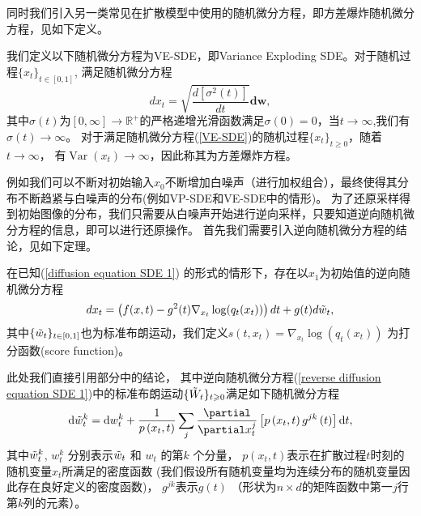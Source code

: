 同时我们引入另一类常见在扩散模型中使用的随机微分方程，即方差爆炸随机微分方程，见如下定义。
\begin{definition}我们定义以下随机微分方程为VE-SDE，即Variance Exploding SDE。对于随机过程$\{x_t\}_{t\in [0,1]}$, 满足随机微分方程
    \begin{equation}
        dx_t = \sqrt{\frac{d\left[\sigma^2(t)\right]}{dt}}\mathbf{d}\mathbf{w}, \label{VE-SDE}
    \end{equation}
    其中$\sigma(t)$为$[0,\infty]\xrightarrow{}\mathbb{R}^+$的严格递增光滑函数满足$\sigma(0)=0$，当$t\to \infty$,我们有 $\sigma(t)\xrightarrow{}\infty$。
    对于满足随机微分方程(\ref{VE-SDE})的随机过程$\{x_t\}_{t\geq 0}$，随着$t\to \infty$， 有$\operatorname{Var}(x_t)\xrightarrow{}\infty$，因此称其为方差爆炸方程。 
\end{definition}

例如我们可以不断对初始输入$x_0$不断增加白噪声（进行加权组合），最终使得其分布不断趋紧与白噪声的分布(例如VP-SDE和VE-SDE中的情形)。 为了还原采样得到初始图像的分布，我们只需要从白噪声开始进行逆向采样，只要知道逆向随机微分方程的信息，即可以进行还原操作。 首先我们需要引入逆向随机微分方程的结论，见如下定理。

\begin{theorem}[逆向随机微分方程]
在已知(\ref{diffusion equation SDE 1}) 的形式的情形下，存在以$x_1$为初始值的逆向随机微分方程
\begin{equation}
     dx_t= \left(f(x,t)-g^2(t)\nabla_{x_t}\log(q_t(x_t))\right)dt + g(t)d\Tilde{w}_t,
    \label{reverse diffusion equation SDE 1}
\end{equation}
其中$\{\Tilde{w}_t\}_{t\in [0,1]}$也为标准布朗运动，我们定义$s(t,x_t) = \nabla_{x_t}\log(q_t(x_t))$ 为打分函数(score function)。
\end{theorem}
    此处我们直接引用部分\cite{Anderson1982ReversetimeDE}中的结论， 其中逆向随机微分方程(\ref{reverse diffusion equation SDE 1})中的标准布朗运动$\{\Tilde{W}_t\}_{t\geq 0}$满足如下随机微分方程
    \begin{equation}
     \mathrm{d} \Tilde{w}_t^k=\mathrm{d} w_t^k+\frac{1}{p\left(x_t, t\right)} \sum_j \frac{\partial}{\partial x_t^j}\left[p\left(x_t, t\right) g^{j k}\left(t\right)\right] \mathrm{d} t,
        \label{Tilde W SDE equation}
    \end{equation}
其中$\Tilde{w}_t^k$, $w_t^k$ 分别表示$\Tilde{w}_t$ 和 $w_t$ 的第$k$ 个分量， $p(x_t,t)$表示在扩散过程$t$时刻的随机变量$x_t$所满足的密度函数 (我们假设所有随机变量均为连续分布的随机变量因此存在良好定义的密度函数)， $g^{jk}$表示$g(t)$ （形状为$n\times d$的矩阵函数中第一$j$行第$k$列的元素）。 

